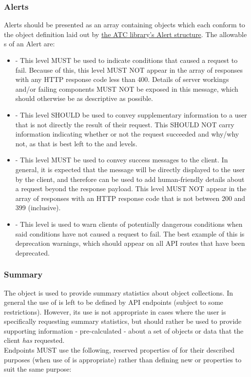 \subsubsection{Alerts}
Alerts should be presented as an array containing objects which each conform to the object definition laid out by
\href{https://godoc.org/github.com/apache/trafficcontrol/lib/go-tc#Alert}{the ATC library's Alert structure}. The allowable s of an Alert are:

\begin{itemize}
	\item {} - This level MUST be used to indicate conditions that caused a request to fail. Because of this, this level MUST NOT appear
	in the  array of responses with any HTTP response code less than 400. Details of server workings and/or failing
	components MUST NOT be exposed in this message, which should otherwise be as descriptive as possible.
	\item {} - This level SHOULD be used to convey supplementary information to a user that is not directly the result of their request.
	This SHOULD NOT carry information indicating whether or not the request succeeded and why/why not, as that is best left to the 
	and  levels.
	\item {} - This level MUST be used to convey success messages to the client. In general, it is expected that the message will be
	directly displayed to the user by the client, and therefore can be used to add human-friendly details about a request beyond the response
	payload. This level MUST NOT appear in the  array of responses with an HTTP response code that is not between 200 and 399
	(inclusive).
	\item {} - This level is used to warn clients of potentially dangerous conditions when said conditions have not caused a request
	to fail. The best example of this is deprecation warnings, which should appear on all API routes that have been deprecated.
\end{itemize}

\subsubsection{Summary\label{sec:summary-object}}
The  object is used to provide summary statistics about object
collections. In general the use of  is left to be defined by API
endpoints (subject to some restrictions). However, its use is not appropriate in
cases where the user is specifically requesting summary statistics, but should
rather be used to provide supporting information - pre-calculated - about a set
of objects or data that the client \emph{has} requested.\\
Endpoints MUST use the following, reserved properties of  for
their described purposes (when use of  is appropriate) rather than
defining new  or  properties to suit the same
purpose:

